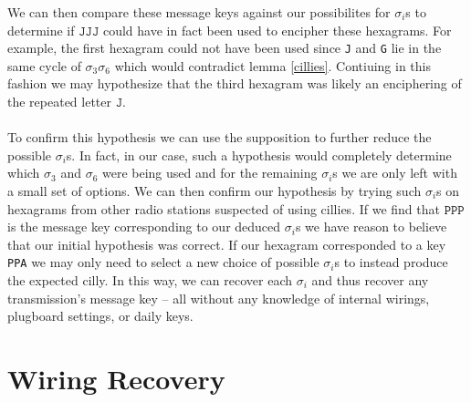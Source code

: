 We can then compare these message keys against our possibilites for
$\sigma_i$s to determine if $\texttt{JJJ}$ could have in fact been
used to encipher these hexagrams. For example, the first hexagram
could not have been used since \texttt{J} and \texttt{G} lie in the
same cycle of $\sigma_3\sigma_6$ which would contradict lemma
\ref{cillies}. Contiuing in this fashion we may hypothesize that the
third hexagram was likely an enciphering of the repeated letter $\texttt{J}$.
\\\\To confirm this hypothesis we can use the supposition to further
reduce the possible $\sigma_i$s. In fact, in our case, such a
hypothesis would completely determine which $\sigma_3$ and $\sigma_6$
were being used and for the remaining $\sigma_i$s we are only left
with a small set of options. We can then confirm our hypothesis by
trying such $\sigma_i$s on hexagrams from other radio stations
suspected of using cillies. If we find that $\texttt{PPP}$ is the
message key corresponding to our deduced $\sigma_i$s we have reason
to believe that our initial hypothesis was correct. If our hexagram
corresponded to a key \texttt{PPA} we may only need to select a new
choice of possible $\sigma_i$s to instead produce the expected cilly.
In this way, we can recover each $\sigma_i$ and thus recover any
transmission's message key -- all without any knowledge of internal
wirings, plugboard settings, or daily keys.
\section{Wiring Recovery}

